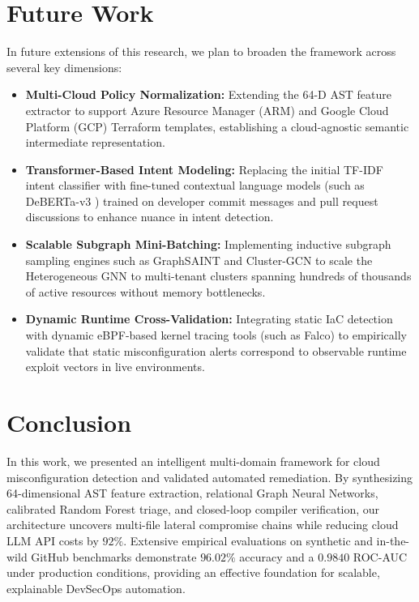\documentclass[conference]{IEEEtran}
\begin{document}
\section{Future Work}
In future extensions of this research, we plan to broaden the framework across several key dimensions:
\begin{itemize}
    \item \textbf{Multi-Cloud Policy Normalization:} Extending the 64-D AST feature extractor to support Azure Resource Manager (ARM) and Google Cloud Platform (GCP) Terraform templates, establishing a cloud-agnostic semantic intermediate representation.
    \item \textbf{Transformer-Based Intent Modeling:} Replacing the initial TF-IDF intent classifier with fine-tuned contextual language models (such as DeBERTa-v3 \cite{he2021deberta}) trained on developer commit messages and pull request discussions to enhance nuance in intent detection.
    \item \textbf{Scalable Subgraph Mini-Batching:} Implementing inductive subgraph sampling engines such as GraphSAINT \cite{zeng2020graphsaint} and Cluster-GCN to scale the Heterogeneous GNN to multi-tenant clusters spanning hundreds of thousands of active resources without memory bottlenecks.
    \item \textbf{Dynamic Runtime Cross-Validation:} Integrating static IaC detection with dynamic eBPF-based kernel tracing tools (such as Falco) to empirically validate that static misconfiguration alerts correspond to observable runtime exploit vectors in live environments.
\end{itemize}

\section{Conclusion}
In this work, we presented an intelligent multi-domain framework for cloud misconfiguration detection and validated automated remediation. By synthesizing 64-dimensional AST feature extraction, relational Graph Neural Networks, calibrated Random Forest triage, and closed-loop compiler verification, our architecture uncovers multi-file lateral compromise chains while reducing cloud LLM API costs by $92\%$. Extensive empirical evaluations on synthetic and in-the-wild GitHub benchmarks demonstrate $96.02\%$ accuracy and a $0.9840$ ROC-AUC under production conditions, providing an effective foundation for scalable, explainable DevSecOps automation.



\end{document}
